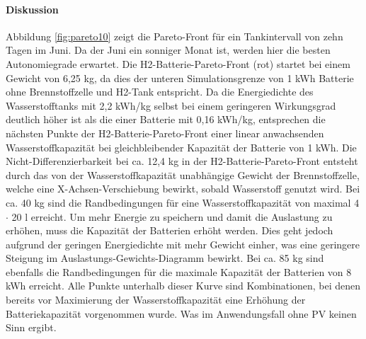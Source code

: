 \paragraph{Diskussion}
Abbildung \ref{fig:pareto10} zeigt die Pareto-Front für ein Tankintervall von zehn Tagen im Juni. Da der Juni ein sonniger Monat ist, werden hier die besten Autonomiegrade erwartet. Die H2-Batterie-Pareto-Front (rot) startet bei einem Gewicht von 6,25 kg, da dies der unteren Simulationsgrenze von 1 kWh Batterie ohne Brennstoffzelle und H2-Tank entspricht. Da die Energiedichte des Wasserstofftanks mit 2,2 kWh/kg selbst bei einem geringeren Wirkungsgrad deutlich höher ist als die einer Batterie mit 0,16 kWh/kg, entsprechen die nächsten Punkte der H2-Batterie-Pareto-Front einer linear anwachsenden Wasserstoffkapazität bei gleichbleibender Kapazität der Batterie von 1 kWh. Die Nicht-Differenzierbarkeit bei ca. 12,4 kg in der H2-Batterie-Pareto-Front entsteht durch das von der Wasserstoffkapazität unabhängige Gewicht der Brennstoffzelle, welche eine X-Achsen-Verschiebung bewirkt, sobald Wasserstoff genutzt wird. Bei ca. 40 kg sind die Randbedingungen für eine Wasserstoffkapazität von maximal 4 $\cdot$ 20 l erreicht. Um mehr Energie zu speichern und damit die Auslastung zu erhöhen, muss die Kapazität der Batterien erhöht werden. Dies geht jedoch aufgrund der geringen Energiedichte mit mehr Gewicht einher, was eine geringere Steigung im Auslastungs-Gewichts-Diagramm bewirkt. Bei ca. 85 kg sind ebenfalls die Randbedingungen für die maximale Kapazität der Batterien von 8 kWh erreicht. Alle Punkte unterhalb dieser Kurve sind Kombinationen, bei denen bereits vor Maximierung der Wasserstoffkapazität eine Erhöhung der Batteriekapazität vorgenommen wurde. Was im Anwendungsfall ohne PV keinen Sinn ergibt. \\

